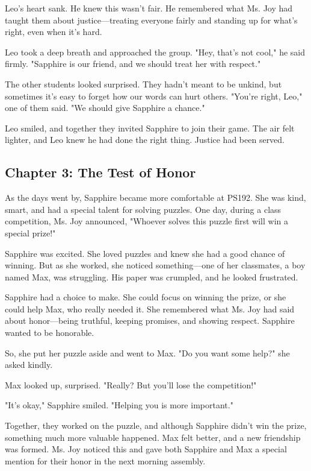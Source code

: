\documentclass[11pt]{article}
\begin{document}
Leo’s heart sank. He knew this wasn’t fair. He remembered what Ms. Joy had taught them about justice—treating everyone fairly and standing up for what’s right, even when it’s hard.

Leo took a deep breath and approached the group. "Hey, that’s not cool," he said firmly. "Sapphire is our friend, and we should treat her with respect."

The other students looked surprised. They hadn’t meant to be unkind, but sometimes it’s easy to forget how our words can hurt others. "You’re right, Leo," one of them said. "We should give Sapphire a chance."

Leo smiled, and together they invited Sapphire to join their game. The air felt lighter, and Leo knew he had done the right thing. Justice had been served.

\subsection{Chapter 3: The Test of Honor}
\label{sec:orgf6365d8}
As the days went by, Sapphire became more comfortable at PS192. She was kind, smart, and had a special talent for solving puzzles. One day, during a class competition, Ms. Joy announced, "Whoever solves this puzzle first will win a special prize!"

Sapphire was excited. She loved puzzles and knew she had a good chance of winning. But as she worked, she noticed something—one of her classmates, a boy named Max, was struggling. His paper was crumpled, and he looked frustrated.

Sapphire had a choice to make. She could focus on winning the prize, or she could help Max, who really needed it. She remembered what Ms. Joy had said about honor—being truthful, keeping promises, and showing respect. Sapphire wanted to be honorable.

So, she put her puzzle aside and went to Max. "Do you want some help?" she asked kindly.

Max looked up, surprised. "Really? But you’ll lose the competition!"

"It’s okay," Sapphire smiled. "Helping you is more important."

Together, they worked on the puzzle, and although Sapphire didn’t win the prize, something much more valuable happened. Max felt better, and a new friendship was formed. Ms. Joy noticed this and gave both Sapphire and Max a special mention for their honor in the next morning assembly.
\end{document}
